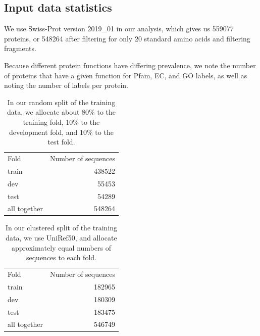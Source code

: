 \subsection*{Input data statistics}

We use Swiss-Prot version 2019\_01 in our analysis, which gives us 559077 proteins, or 548264 after filtering for only 20 standard amino acids and filtering fragments.

Because different protein functions have differing prevalence, we note the number of proteins that have a given function for Pfam, EC, and GO labels, as well as noting the number of labels per protein.

\begin{table}[htbp]
  \centering
  \begin{tabular}{|l|r|}
  \hline
           Fold &  Number of sequences \\
  \Xhline{2pt}
          train &               438522 \\
  \hline
            dev &               55453 \\
  \hline
           test &               54289 \\
  \hline
   all together &               548264 \\
  \hline
  \end{tabular}
  \caption{In our random split of the training data, we allocate about 80\% to the training fold, 10\% to the development fold, and 10\% to the test fold.}
  \end{table}
  \begin{table}[htbp]
  \centering
  \begin{tabular}{|l|r|}
  \hline
           Fold &  Number of sequences \\
  \Xhline{2pt}
          train &               182965 \\
  \hline
            dev &               180309 \\
  \hline
           test &               183475 \\
  \hline
   all together &               546749 \\
  \hline
  \end{tabular}
  \caption{In our clustered split of the training data, we use UniRef50, and allocate approximately equal numbers of sequences to each fold.}
  
  \end{table}


